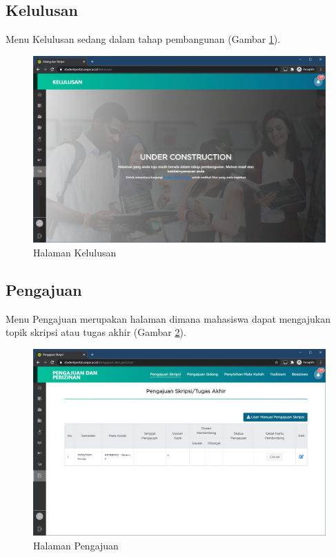 \subsection{Kelulusan}
    Menu Kelulusan sedang dalam tahap pembangunan (Gambar \ref{fig:3_kelulusan}).
    \begin{figure}[H]
    	\centering
    	\includegraphics[scale=0.45]{Gambar/kelulusan.png}
    	\caption{Halaman Kelulusan} 
    	\label{fig:3_kelulusan}
    \end{figure}

\subsection{Pengajuan}
    Menu Pengajuan merupakan halaman dimana mahasiswa dapat mengajukan topik skripsi atau tugas akhir (Gambar \ref{fig:3_pengajuan}).
    \begin{figure}[H]
    	\centering
    	\includegraphics[scale=0.45]{Gambar/pengajuan.png}
    	\caption{Halaman Pengajuan} 
    	\label{fig:3_pengajuan}
    \end{figure}
    

